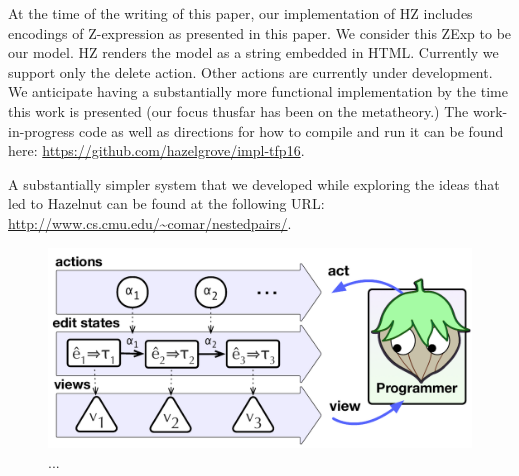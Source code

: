 At the time of the writing of this paper, our implementation of HZ includes encodings of Z-expression as presented in this paper.
We consider this ZExp to be our model. 
HZ renders the model as a string embedded in HTML.
Currently we support only the delete action.  Other actions are currently under development. We anticipate having a substantially more functional implementation by the time this work is presented (our focus thusfar has been on the metatheory.) 
The work-in-progress code as well as directions for how to compile and run it can be found here: \url{https://github.com/hazelgrove/impl-tfp16}.

A substantially simpler system that we developed while exploring the ideas that led to Hazelnut can be found at the following URL:
\url{http://www.cs.cmu.edu/~comar/nestedpairs/}.


\begin{figure}
\centering
\includegraphics[width=0.90\columnwidth]{impl-overview2}
\caption{...}
\label{fig:impl-overview}
\end{figure}
